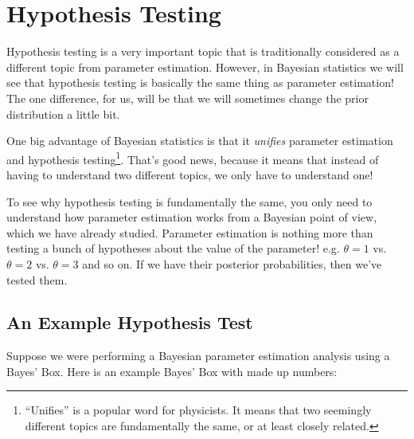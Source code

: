 \chapter{Hypothesis Testing}
Hypothesis testing is a very important topic that is traditionally considered
as a different topic from parameter estimation. However, in Bayesian statistics
we will see that hypothesis testing is basically the same thing as parameter
estimation! The one difference, for us, will be that we will sometimes change
the prior distribution a little bit.

One big advantage of Bayesian statistics is that it {\it unifies}
parameter estimation and hypothesis
testing\footnote{``Unifies'' is a popular word for physicists. It means that
two seemingly different topics are fundamentally the same, or at least closely
related.}. That's good news, because it means that instead of having to
understand two different topics, we only have to understand one!

To see why hypothesis testing is fundamentally the same, you only need to
understand how parameter estimation works from a Bayesian point of view, which
we have already studied.
Parameter estimation is nothing more than testing a bunch of hypotheses about
the value of the parameter! e.g. $\theta=1$ vs. $\theta=2$ vs. $\theta=3$ and
so on. If we have their posterior probabilities, then we've tested them.

\section{An Example Hypothesis Test}
Suppose we were performing a Bayesian parameter estimation analysis using a
Bayes' Box. Here is an example Bayes' Box with made up numbers:

